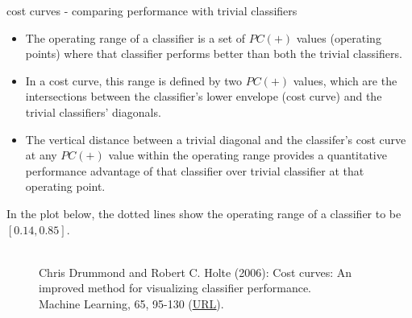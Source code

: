 \begin{vbframe}{cost curves - comparing performance with trivial classifiers}
  \begin{itemize}
    \item The operating range of a classifier is a set of $PC(+)$ values (operating points) where that classifier performs better than both the trivial classifiers.
    \item In a cost curve, this range is defined by two $PC(+)$ values, which are the intersections between the classifier's lower envelope (cost curve) and the trivial classifiers' diagonals.
    \item The vertical distance between a trivial diagonal and the classifer's cost curve at any $PC(+)$ value within the operating range provides a quantitative performance advantage of that classifier over trivial classifier at that operating point.
  \end{itemize}
  \pagebreak
  In the plot below, the dotted lines show the operating range of a classifier to be $[0.14, 0.85]$.
  \begin{figure}
    \centering
    \tiny
    \\Chris Drummond and Robert C. Holte (2006): Cost curves: An improved
    method for visualizing classifier performance. \\Machine Learning, 65, 95-130
    (\href{https://www.semanticscholar.org/paper/Cost-curves\%3A-An-improved-method-for  -visualizing-Drummond-Holte/71708ce984e0896e7383435913547e770572410e}
    {\underline{URL}}).
  \end{figure}
  
\end{vbframe}


